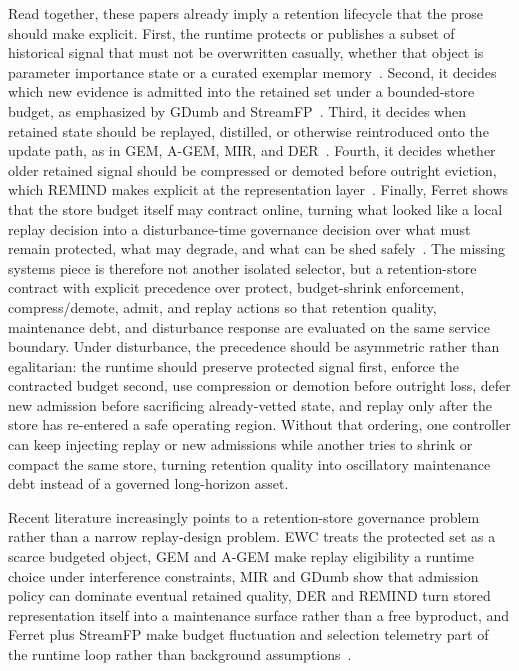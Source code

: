 \documentclass[acmsmall,screen,review]{acmart}
\begin{document}
Read together, these papers already imply a retention lifecycle that the prose should make explicit. First, the runtime protects or publishes a subset of historical signal that must not be overwritten casually, whether that object is parameter importance state or a curated exemplar memory~\cite{kirkpatrick2017ewc,rebuffi2017icarl}. Second, it decides which new evidence is admitted into the retained set under a bounded-store budget, as emphasized by GDumb and StreamFP~\cite{prabhu2020gdumb,li2026streamfp}. Third, it decides when retained state should be replayed, distilled, or otherwise reintroduced onto the update path, as in GEM, A-GEM, MIR, and DER~\cite{lopez2017gem,chaudhry2019agem,aljundi2019mir,buzzega2020der}. Fourth, it decides whether older retained signal should be compressed or demoted before outright eviction, which REMIND makes explicit at the representation layer~\cite{hayes2020remind}. Finally, Ferret shows that the store budget itself may contract online, turning what looked like a local replay decision into a disturbance-time governance decision over what must remain protected, what may degrade, and what can be shed safely~\cite{zhou2025ferret}. The missing systems piece is therefore not another isolated selector, but a retention-store contract with explicit precedence over protect, budget-shrink enforcement, compress/demote, admit, and replay actions so that retention quality, maintenance debt, and disturbance response are evaluated on the same service boundary. Under disturbance, the precedence should be asymmetric rather than egalitarian: the runtime should preserve protected signal first, enforce the contracted budget second, use compression or demotion before outright loss, defer new admission before sacrificing already-vetted state, and replay only after the store has re-entered a safe operating region. Without that ordering, one controller can keep injecting replay or new admissions while another tries to shrink or compact the same store, turning retention quality into oscillatory maintenance debt instead of a governed long-horizon asset.

Recent literature increasingly points to a retention-store governance problem rather than a narrow replay-design problem. EWC treats the protected set as a scarce budgeted object, GEM and A-GEM make replay eligibility a runtime choice under interference constraints, MIR and GDumb show that admission policy can dominate eventual retained quality, DER and REMIND turn stored representation itself into a maintenance surface rather than a free byproduct, and Ferret plus StreamFP make budget fluctuation and selection telemetry part of the runtime loop rather than background assumptions~\cite{kirkpatrick2017ewc,lopez2017gem,chaudhry2019agem,aljundi2019mir,prabhu2020gdumb,buzzega2020der,hayes2020remind,zhou2025ferret,li2026streamfp}.
\end{document}
